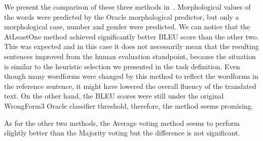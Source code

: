 We present the comparison of these three methods in~. Morphological values of the 
words were predicted by the Oracle morphological predictor, but only a morphological case, number and gender were predicted.
We can notice that the AtLeastOne method achieved
significantly better BLEU score than the other two. This was expected and in this case it does
not necessarily mean that the resulting sentences improved from the human evaluation standpoint, because
the situation is similar to the heuristic selection we presented in the task definition. Even though
many wordforms were changed by this method to reflect the wordforms in the reference sentence, it
might have lowered the overall fluency of the translated text. On the other hand, the BLEU scores were
still under the original WrongForm3 Oracle classifier threshold, therefore, the method seems promising.

As for the other two methods, the Average
voting method seems to perform slightly better than the Majority voting but the difference is not significant.

